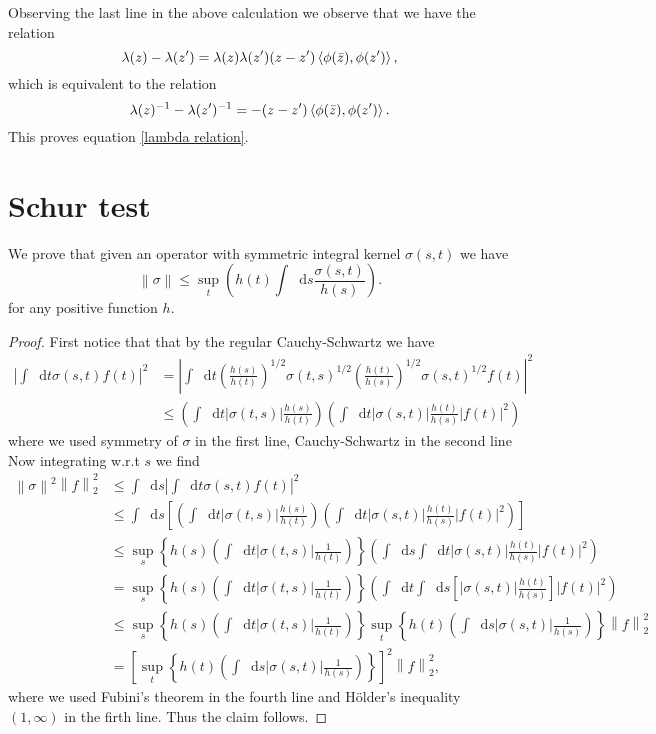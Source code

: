 \documentclass[a4paper,11pt]{article}
\newcommand{\norm}[1]{\left\lVert #1 \right\rVert}
\newcommand{\abs}[1]{\left\lvert #1 \right\rvert}
\newcommand*\diff{\mathop{}\!\mathrm{d}}
\numberwithin{equation}{section}
\begin{document}
Observing the last line in the above calculation we observe that we have the relation\begin{equation}
\lambda(z)-\lambda(z')=\lambda(z)\lambda(z')(z-z')\braket{\phi(\bar{z}),\phi(z')},
\end{equation}
which is equivalent to the relation\begin{equation}
\lambda(z)^{-1}-\lambda(z')^{-1}=-(z-z')\braket{\phi(\bar{z}),\phi(z')}.
\end{equation}
This proves equation \eqref{lambda relation}.
\section{Schur test}
We prove that given an operator with symmetric integral kernel $ \sigma(s,t) $ we have\begin{equation}
\norm{\sigma}\leq\sup_{t}\left(h(t)\int\diff s \frac{\sigma(s,t)}{h(s)}\right).
\end{equation}
for any positive function $ h $.
\begin{proof}
	First notice that that by the regular Cauchy-Schwartz we have \begin{equation}
	\begin{aligned}
	\abs{\int\diff t\sigma(s,t)f(t)}^2&=\abs{\int\diff t\left(\frac{h(s)}{h(t)}\right)^{1/2}\sigma(t,s)^{1/2}\left(\frac{h(t)}{h(s)}\right)^{1/2}\sigma(s,t)^{1/2}f(t)}^2\\
	&\leq \left(\int\diff t \abs{\sigma(t,s)}\frac{h(s)}{h(t)}\right)\left(\int\diff t \abs{\sigma(s,t)}\frac{h(t)}{h(s)}\abs{f(t)}^2\right)
	\end{aligned}
	\end{equation}
	where we used symmetry of $ \sigma $ in the first line, Cauchy-Schwartz in the second line Now integrating w.r.t $ s $ we find\begin{equation}
	\begin{aligned}
	\norm{\sigma}^2\norm{f}_2^2&\leq\int\diff s	\abs{\int\diff t\sigma(s,t)f(t)}^2\\&
	\leq\int\diff s\left[\left(\int\diff t \abs{\sigma(t,s)}\frac{h(s)}{h(t)}\right)\left(\int\diff t \abs{\sigma(s,t)}\frac{h(t)}{h(s)}\abs{f(t)}^2\right)\right]\\&
	\leq\sup_{s}\left\{h(s)\left(\int\diff t \abs{\sigma(t,s)}\frac{1}{h(t)}\right)\right\}\left(\int\diff s\int\diff t \abs{\sigma(s,t)}\frac{h(t)}{h(s)}\abs{f(t)}^2\right)
	\\&
	=\sup_{s}\left\{h(s)\left(\int\diff t \abs{\sigma(t,s)}\frac{1}{h(t)}\right)\right\}\left(\int\diff t\int\diff s\left[ \abs{\sigma(s,t)}\frac{h(t)}{h(s)}\right]\abs{f(t)}^2\right)
	\\&
	\leq\sup_{s}\left\{h(s)\left(\int\diff t \abs{\sigma(t,s)}\frac{1}{h(t)}\right)\right\}\sup_{t}\left\{h(t)\left(\int\diff s \abs{\sigma(s,t)}\frac{1}{h(s)}\right)\right\}\norm{f}^2_2
	\\&=\left[\sup_{t}\left\{h(t)\left(\int\diff s \abs{\sigma(s,t)}\frac{1}{h(s)}\right)\right\}\right]^2\norm{f}^2_2,
	\end{aligned}
	\end{equation}
	where we used Fubini's theorem in the fourth line and H\"older's inequality $ (1,\infty) $ in the firth line.
	Thus the claim follows.
\end{proof}
\end{document}
